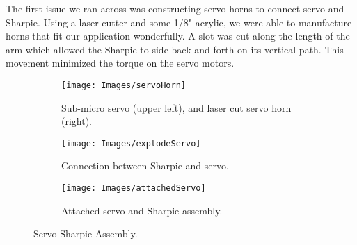 \documentclass[11pt, oneside]{article}
\begin{document}
The first issue we ran across was constructing servo horns to connect servo and Sharpie. Using a laser cutter and some 1/8" acrylic, we were able to manufacture horns that fit our application wonderfully. A slot was cut along the length of the arm which allowed the Sharpie to side back and forth on its vertical path. This movement minimized the torque on the servo motors.


\begin{figure}[H]
    \centering
    \begin{subfigure}[b]{0.38\textwidth}
        \centering
        \texttt{[image: Images/servoHorn]}
        \caption{Sub-micro servo (upper left), and laser cut servo horn (right).}
        \label{fig:servoHorn}
    \end{subfigure}
    \begin{subfigure}[b]{0.3\textwidth}
        \texttt{[image: Images/explodeServo]}
        \caption{Connection between Sharpie and servo.}
        \label{fig:explodeServo}
    \end{subfigure}
    \begin{subfigure}[b]{0.3\textwidth}
        \texttt{[image: Images/attachedServo]}
        \caption[center]{Attached servo and Sharpie assembly.}
        \label{fig:attachedServo}
    \end{subfigure}
    \caption{Servo-Sharpie Assembly.}
    \label{fig:ServSharpAss}
\end{figure}
 
\end{document}
